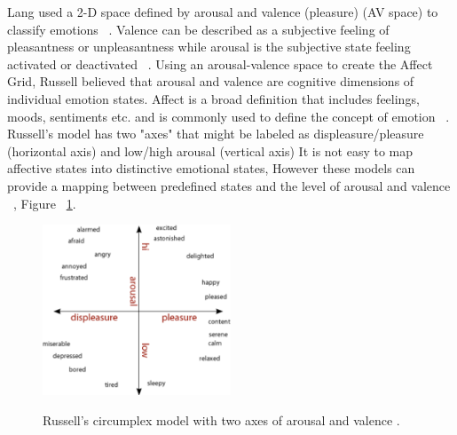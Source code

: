 Lang used a 2-D space defined by arousal and valence (pleasure) (AV space) 
to classify emotions ~\cite{lang1995emotion}. Valence can be
described as a subjective feeling of pleasantness or unpleasantness while 
arousal is the subjective state feeling activated
or deactivated ~\cite{barrett1998discrete}. Using an arousal-valence space to create
the Affect Grid, Russell believed that arousal and valence
are cognitive dimensions of individual emotion states. Affect is a broad definition 
that includes feelings, moods, sentiments etc. and is commonly used to define the concept of
emotion ~\cite{picard2003affective}. Russell's model has two "axes"
that might be labeled as displeasure/pleasure (horizontal
axis) and low/high arousal (vertical axis) It is not easy to
map affective states into distinctive emotional states, However these models can 
provide a mapping between predefined
states and the level of arousal and valence ~\cite{zagalo2004story}, 
Figure ~\ref{fig:russelavspace}.

\begin{figure}[h!]
  \caption[Russell's arousal and valence model]
  {Russell's circumplex model with two axes of arousal and valence \footnotemark.}
  \centering
  \includegraphics[width=0.5\textwidth]{images/russell-av-space.pdf}
  \label{fig:russelavspace}
\end{figure}


